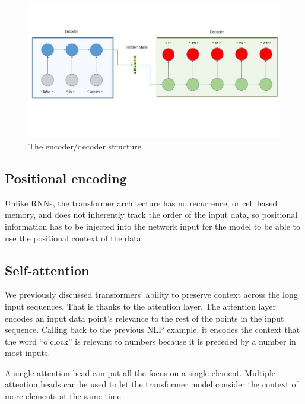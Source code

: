\begin{figure}
    \centering
    \includegraphics[scale=0.5]{imgs/encoder_decoder.jpeg}
    \caption{The encoder/decoder structure \cite{nechu_what_2020}
    \label{fig:encoder_decoder}}
\end{figure}

\subsection{Positional encoding}
Unlike RNNs, the transformer architecture has no recurrence, or cell based memory, and does not inherently track the order of the input data, so positional information has to be injected into the network input for the model to be able to use the positional context of the data.\cite{vaswani_attention_2017}

\subsection{Self-attention} We previously discussed transformers' ability to preserve context across the long input sequences. That is thanks to the attention layer. The attention layer encodes an input data point's relevance to the rest of the points in the input sequence. Calling back to the previous NLP example, it encodes the context that the word \enquote{o'clock} is relevant to numbers because it is preceded by a number in most inputs.
 
A single attention head can put all the focus on a single element. Multiple attention heads can be used to let the transformer model consider the context of more elements at the same time \cite{rohrer_transformers_2021}.

